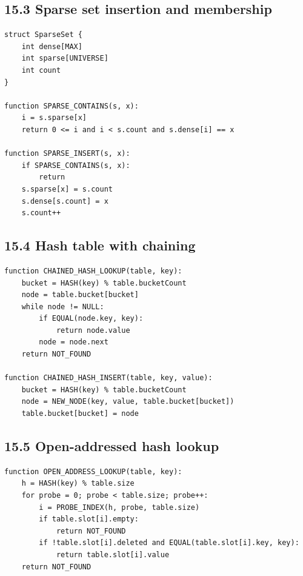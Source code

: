 \documentclass[10pt,letterpaper]{article}
\begin{document}
\subsection*{15.3 Sparse set insertion and membership}

\begin{verbatim}
struct SparseSet {
    int dense[MAX]
    int sparse[UNIVERSE]
    int count
}

function SPARSE_CONTAINS(s, x):
    i = s.sparse[x]
    return 0 <= i and i < s.count and s.dense[i] == x

function SPARSE_INSERT(s, x):
    if SPARSE_CONTAINS(s, x):
        return
    s.sparse[x] = s.count
    s.dense[s.count] = x
    s.count++
\end{verbatim}

\subsection*{15.4 Hash table with chaining}

\begin{verbatim}
function CHAINED_HASH_LOOKUP(table, key):
    bucket = HASH(key) % table.bucketCount
    node = table.bucket[bucket]
    while node != NULL:
        if EQUAL(node.key, key):
            return node.value
        node = node.next
    return NOT_FOUND

function CHAINED_HASH_INSERT(table, key, value):
    bucket = HASH(key) % table.bucketCount
    node = NEW_NODE(key, value, table.bucket[bucket])
    table.bucket[bucket] = node
\end{verbatim}

\subsection*{15.5 Open-addressed hash lookup}

\begin{verbatim}
function OPEN_ADDRESS_LOOKUP(table, key):
    h = HASH(key) % table.size
    for probe = 0; probe < table.size; probe++:
        i = PROBE_INDEX(h, probe, table.size)
        if table.slot[i].empty:
            return NOT_FOUND
        if !table.slot[i].deleted and EQUAL(table.slot[i].key, key):
            return table.slot[i].value
    return NOT_FOUND
\end{verbatim}
\end{document}
